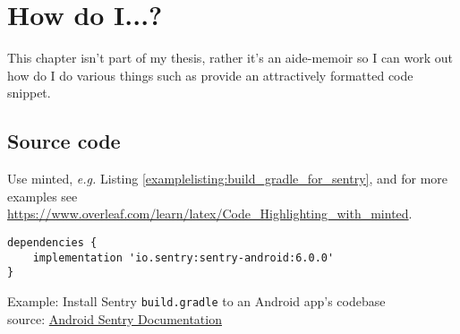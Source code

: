 \chapter{How do I...?}
This chapter isn't part of my thesis, rather it's an aide-memoir so I can work out how do I do various things such as provide an attractively formatted code snippet.

\section{Source code}
Use minted, \textit{e.g.} Listing \ref{examplelisting:build_gradle_for_sentry}, and for more examples see \url{https://www.overleaf.com/learn/latex/Code_Highlighting_with_minted}.

\begin{listing}
\begin{verbatim}
dependencies {
    implementation 'io.sentry:sentry-android:6.0.0'
}
\end{verbatim}
\caption{Example: Install Sentry \texttt{build.gradle} to an Android app's codebase\\source: \href{https://docs.sentry.io/platforms/android/}{Android Sentry Documentation}}
\label{examplelisting:build_gradle_for_sentry}
\end{listing}